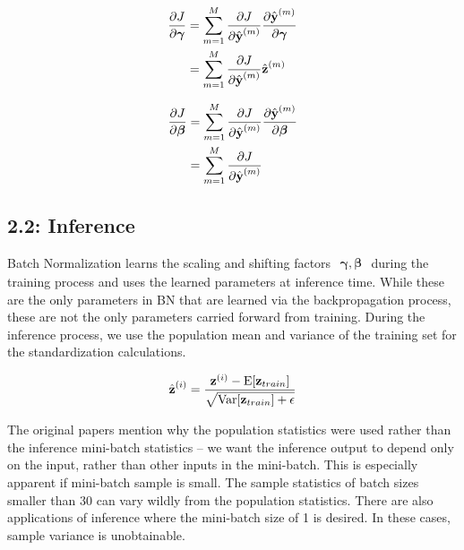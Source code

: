 \documentclass{article}
\begin{document}
\begin{multicols}{2}
\begin{equation}
    \begin{aligned}
        {\partial J \over \partial \boldsymbol{\gamma}}
        & =
        \sum_{m=1}^M{\partial J\over \partial \hat{\textbf{y}}^{(m)}}
        {\partial \hat{\textbf{y}}^{(m)} \over \partial \boldsymbol{\gamma}} \\
        & =
        \sum_{m=1}^M{\partial J\over \partial \hat{\textbf{y}}^{(m)}}
        \hat{\textbf{z}}^{(m)} 
    \end{aligned}
\end{equation}

\begin{equation}
    \begin{aligned}
        {\partial J \over \partial \boldsymbol{\beta}}
        & =
        \sum_{m=1}^M{\partial J\over \partial \hat{\textbf{y}}^{(m)}} 
        {\partial \hat{\textbf{y}}^{(m)} \over \partial \boldsymbol{\beta}} \\
        & =
        \sum_{m=1}^M{\partial J\over \partial \hat{\textbf{y}}^{(m)}}
    \end{aligned}
\end{equation}









\subsection*{2.2: Inference}

Batch Normalization learns the scaling and shifting factors $\begin{aligned}
    \boldsymbol{\gamma}, \boldsymbol{\beta}
\end{aligned}$ during the training process and uses the learned parameters at inference 
time. While these are the only parameters in BN that are learned via the 
backpropagation process, these are not the only parameters carried forward
from training. During the inference process, we use the population mean 
and variance of the training set for the standardization calculations.

\begin{equation}
    \hat{\textbf{z}}^{(i)} = {\textbf{z}^{(i)} - \text{E}[\textbf{z}_{train}] \over \sqrt{\text{Var}[\textbf{z}_{train}] + \epsilon}}
\end{equation}

The original papers\cite{batchnorm} mention why the population statistics were used rather 
than the inference mini-batch statistics -- we want the inference output
to depend only on the input, rather than other inputs in the mini-batch.
This is especially apparent if mini-batch sample is small. The sample statistics
of batch sizes smaller than 30\cite{CLT} can vary wildly from the population statistics.
There are also applications of inference where the mini-batch size of 1 is 
desired. In these cases, sample variance is unobtainable.


\end{multicols}
\end{document}
